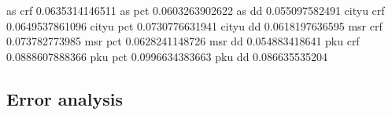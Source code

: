 as crf
0.0635314146511
as pct
0.0603263902622
as dd
0.055097582491
cityu crf
0.0649537861096
cityu pct
0.0730776631941
cityu dd
0.0618197636595
msr crf
0.073782773985
msr pct
0.0628241148726
msr dd
0.054883418641
pku crf
0.0888607888366
pku pct
0.0996634383663
pku dd
0.086635535204
%
%
%
%
%
%

\subsection{Error analysis}

